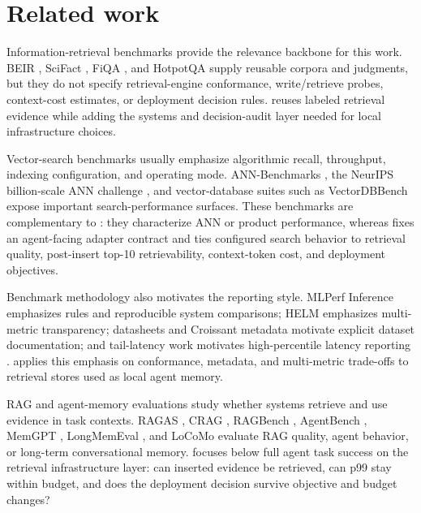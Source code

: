 \section{Related work}

Information-retrieval benchmarks provide the relevance backbone for this work. BEIR \citep{thakur2021beir}, SciFact \citep{wadden2020scifact}, FiQA \citep{maia2018fiqa}, and HotpotQA \citep{yang2018hotpotqa} supply reusable corpora and judgments, but they do not specify retrieval-engine conformance, write/retrieve probes, context-cost estimates, or deployment decision rules. \sys reuses labeled retrieval evidence while adding the systems and decision-audit layer needed for local infrastructure choices.

Vector-search benchmarks usually emphasize algorithmic recall, throughput, indexing configuration, and operating mode. ANN-Benchmarks \citep{aumuller2020ann}, the NeurIPS billion-scale ANN challenge \citep{simhadri2021bigann}, and vector-database suites such as VectorDBBench \citep{vectordbbench} expose important search-performance surfaces. These benchmarks are complementary to \sys: they characterize ANN or product performance, whereas \sys fixes an agent-facing adapter contract and ties configured search behavior to retrieval quality, post-insert top-10 retrievability, context-token cost, and deployment objectives.

Benchmark methodology also motivates the reporting style. MLPerf Inference \citep{reddi2019mlperf} emphasizes rules and reproducible system comparisons; HELM \citep{liang2023helm} emphasizes multi-metric transparency; datasheets \citep{gebru2021datasheets} and Croissant metadata \citep{mlcommons2024croissant} motivate explicit dataset documentation; and tail-latency work motivates high-percentile latency reporting \citep{dean2013tail}. \sys applies this emphasis on conformance, metadata, and multi-metric trade-offs to retrieval stores used as local agent memory.

RAG and agent-memory evaluations study whether systems retrieve and use evidence in task contexts. RAGAS \citep{es2024ragas}, CRAG \citep{facebookcrag}, RAGBench \citep{friel2024ragbench}, AgentBench \citep{liu2023agentbench}, MemGPT \citep{packer2023memgpt}, LongMemEval \citep{wu2024longmemeval}, and LoCoMo \citep{maharana2024locomo} evaluate RAG quality, agent behavior, or long-term conversational memory. \sys focuses below full agent task success on the retrieval infrastructure layer: can inserted evidence be retrieved, can p99 stay within budget, and does the deployment decision survive objective and budget changes?
